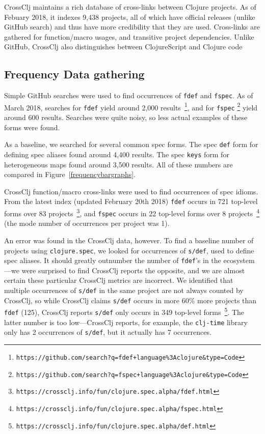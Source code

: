 CrossClj maintains a rich database of cross-links between Clojure projects.
As of Febuary 2018, it indexes 9,438 projects, all of which have official releases (unlike
GitHub search) and thus have more credibility that they are used.
Cross-links are gathered for function/macro usages, and transitive project dependencies.
Unlike GitHub, CrossClj also distinguishes between ClojureScript and Clojure code

\subsection{Frequency Data gathering}

Simple GitHub searches were used to find occurrences of \texttt{fdef} and \texttt{fspec}.
As of March 2018,
searches for \texttt{fdef}
yield around 2,000 results~\footnote{\texttt{https://github.com/search?q=fdef+language\%3Aclojure\&type=Code}},
and for \texttt{fspec} 
\footnote{\texttt{https://github.com/search?q=fspec+language\%3Aclojure\&type=Code}}
yield around 600 results.
Searches were quite noisy, so less actual examples of these forms were found.

As a baseline, we searched for several common spec forms.
The spec \texttt{def} form for defining spec aliases found around 4,400 results.
The spec \texttt{keys} form for heterogeneous maps found around 3,500 results.
All of these numbers are compared in Figure~\ref{frequencybargraphs}.

CrossClj function/macro cross-links were used to find occurrences of spec idioms.
From the latest index (updated February 20th 2018)
\texttt{fdef} occurs in 721 top-level forms over 83 
projects~\footnote{\texttt{https://crossclj.info/fun/clojure.spec.alpha/fdef.html}}, and
\texttt{fspec} occurs in 22 top-level forms over 8 
projects~\footnote{\texttt{https://crossclj.info/fun/clojure.spec.alpha/fspec.html}}
(the mode number of occurrences per project was 1).

An error was found in the CrossClj data, however.
To find a baseline number of projects using \texttt{clojure.spec}, we looked for occurrences of
\texttt{s/def}, used to define spec
aliases. It should greatly outnumber the number of \texttt{fdef}'s in the ecosystem---we were
surprised to find CrossClj reports the opposite, and
we are almost certain these particular CrossClj metrics are incorrect.
We identified that multiple occurrences of \texttt{s/def} in the same project are not always counted by CrossClj,
so while CrossClj claims \texttt{s/def} occurs in more 60\% more projects than \texttt{fdef} (125), 
CrossClj reports \texttt{s/def} only occurs in 349 top-level 
forms~\footnote{\texttt{https://crossclj.info/fun/clojure.spec.alpha/def.html}}.
The latter number is too low---CrossClj reports, for example, the \texttt{clj-time}
library only has 2 occurrences of \texttt{s/def}, but it actually has 7 occurrences.

